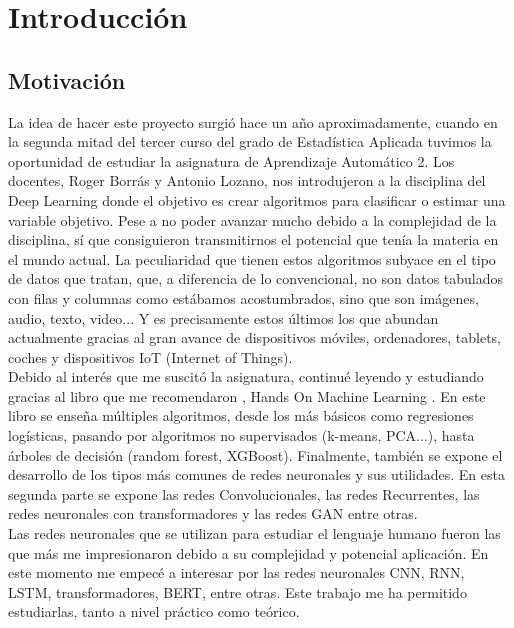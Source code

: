 \documentclass[10pt,riqno,a4paper,twoside]{article}\usepackage[]{graphicx}\usepackage[]{color}
\begin{document}
\clearpage
\tableofcontents
\clearpage

\graphicspath{ {D:/Q2/TFG/data} }




\section{Introducci\'{o}n}

\subsection{Motivaci\'{o}n}

La idea de hacer este proyecto surgi\'{o} hace un año aproximadamente, cuando en la segunda mitad del tercer curso del grado de Estad\'{i}stica Aplicada tuvimos la oportunidad de estudiar la asignatura de Aprendizaje Autom\'{a}tico 2. Los docentes, Roger Borr\'{a}s y Antonio Lozano, nos introdujeron a la disciplina del Deep Learning donde el objetivo es crear algoritmos para clasificar o estimar una variable objetivo. Pese a no poder avanzar mucho debido a la complejidad de la disciplina, s\'{i} que consiguieron transmitirnos el potencial que ten\'{i}a la materia en el mundo actual. La peculiaridad que tienen estos algoritmos subyace en el tipo de datos que tratan, que, a diferencia de lo convencional, no son datos tabulados con filas y columnas como est\'{a}bamos acostumbrados, sino que son im\'{a}genes, audio, texto, video... Y es precisamente estos \'{u}ltimos los que abundan actualmente gracias al gran avance de dispositivos m\'{o}viles, ordenadores, tablets, coches y dispositivos IoT (Internet of Things).\\

Debido al inter\'{e}s que me suscitó la asignatura, continu\'{e} leyendo y estudiando gracias al libro que me recomendaron , Hands On Machine Learning \cite{geron2019hands}. En este libro se enseña m\'{u}ltiples algoritmos, desde los m\'{a}s b\'{a}sicos como regresiones log\'{i}sticas, pasando por algoritmos no supervisados (k-means, PCA...), hasta \'{a}rboles de decisi\'{o}n (random forest, XGBoost). Finalmente, también se expone el desarrollo de los tipos m\'{a}s comunes de redes neuronales y sus utilidades. En esta segunda parte se expone las redes Convolucionales, las redes Recurrentes, las redes neuronales con transformadores y las redes GAN entre otras.\\

Las redes neuronales que se utilizan para estudiar el lenguaje humano fueron las que más me impresionaron debido a su complejidad y potencial aplicación. En este momento me empecé a interesar por las redes neuronales CNN, RNN, LSTM, transformadores, BERT, entre otras. Este trabajo me ha permitido estudiarlas, tanto a nivel práctico como teórico.
\end{document}
